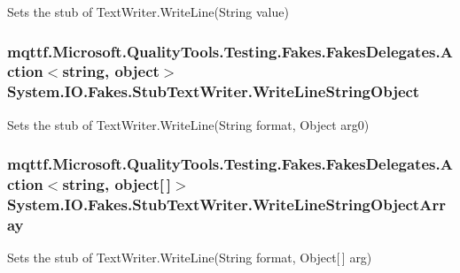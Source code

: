Sets the stub of Text\-Writer.\-Write\-Line(\-String value)

\hypertarget{class_system_1_1_i_o_1_1_fakes_1_1_stub_text_writer_a639e31a00cdec93c8a83ff54b6cfc62c}{
\subsubsection[{Write\-Line\-String\-Object}]{\setlength{\rightskip}{0pt plus 5cm}mqttf.\-Microsoft.\-Quality\-Tools.\-Testing.\-Fakes.\-Fakes\-Delegates.\-Action$<$string, object$>$ System.\-I\-O.\-Fakes.\-Stub\-Text\-Writer.\-Write\-Line\-String\-Object}}\label{class_system_1_1_i_o_1_1_fakes_1_1_stub_text_writer_a639e31a00cdec93c8a83ff54b6cfc62c}


Sets the stub of Text\-Writer.\-Write\-Line(\-String format, Object arg0)

\hypertarget{class_system_1_1_i_o_1_1_fakes_1_1_stub_text_writer_a587abb0dc56db4913b54eea97c67c7d6}{
\subsubsection[{Write\-Line\-String\-Object\-Array}]{\setlength{\rightskip}{0pt plus 5cm}mqttf.\-Microsoft.\-Quality\-Tools.\-Testing.\-Fakes.\-Fakes\-Delegates.\-Action$<$string, object\mbox{[}$\,$\mbox{]}$>$ System.\-I\-O.\-Fakes.\-Stub\-Text\-Writer.\-Write\-Line\-String\-Object\-Array}}\label{class_system_1_1_i_o_1_1_fakes_1_1_stub_text_writer_a587abb0dc56db4913b54eea97c67c7d6}


Sets the stub of Text\-Writer.\-Write\-Line(\-String format, Object\mbox{[}$\,$\mbox{]} arg)

